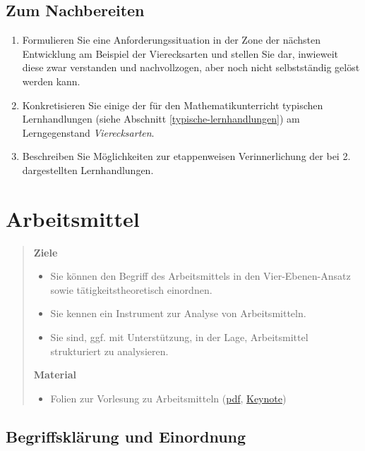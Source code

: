 \documentclass[
]{scrbook}
\providecommand{\tightlist}{%
  \setlength{\itemsep}{0pt}\setlength{\parskip}{0pt}}
\theoremstyle{definition}
\theoremstyle{definition}
\theoremstyle{definition}
\theoremstyle{definition}
\theoremstyle{remark}
\begin{document}
\hypertarget{lerntaetigkeit-nachbereitung}{%
\section{Zum Nachbereiten}\label{lerntaetigkeit-nachbereitung}}

\begin{enumerate}
\def\labelenumi{\arabic{enumi}.}
\item
  Formulieren Sie eine Anforderungssituation in der Zone der nächsten Entwicklung am Beispiel der Vierecksarten und stellen Sie dar, inwieweit diese zwar verstanden und nachvollzogen, aber noch nicht selbstständig gelöst werden kann.
\item
  Konkretisieren Sie einige der für den Mathematikunterricht typischen Lernhandlungen (siehe Abschnitt \ref{typische-lernhandlungen}) am Lerngegenstand \emph{Vierecksarten}.
\item
  Beschreiben Sie Möglichkeiten zur etappenweisen Verinnerlichung der bei 2. dargestellten Lernhandlungen.
\end{enumerate}

\hypertarget{arbeitsmittel}{%
\chapter{Arbeitsmittel}\label{arbeitsmittel}}

\begin{quote}
\textbf{Ziele}

\begin{itemize}
\tightlist
\item
  Sie können den Begriff des Arbeitsmittels in den Vier-Ebenen-Ansatz sowie tätigkeitstheoretisch einordnen.
\item
  Sie kennen ein Instrument zur Analyse von Arbeitsmitteln.
\item
  Sie sind, ggf. mit Unterstützung, in der Lage, Arbeitsmittel strukturiert zu analysieren.
\end{itemize}

\textbf{Material}

\begin{itemize}
\tightlist
\item
  Folien zur Vorlesung zu Arbeitsmitteln (\href{files/Stoffdidaktik-WiSe2223-Kap7.pdf}{pdf}, \href{files/Stoffdidaktik-WiSe2223-Kap7.key}{Keynote})
\end{itemize}
\end{quote}

\hypertarget{arbeitsmittel-begriffsklaerung}{%
\section{Begriffsklärung und Einordnung}\label{arbeitsmittel-begriffsklaerung}}
\end{document}
